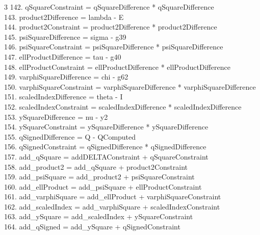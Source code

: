\documentclass[10pt]{article}
\begin{document}
\begin{multicols}{3}
142. qSquareConstraint = qSquareDifference * qSquareDifference\\
143. product2Difference = lambda - E\\
144. product2Constraint = product2Difference * product2Difference\\
145. psiSquareDifference = sigma - g39\\
146. psiSquareConstraint = psiSquareDifference * psiSquareDifference\\
147. ellProductDifference = tau - g40\\
148. ellProductConstraint = ellProductDifference * ellProductDifference\\
149. varphiSquareDifference = chi - g62\\
150. varphiSquareConstraint = varphiSquareDifference * varphiSquareDifference\\
151. scaledIndexDifference = theta - I\\
152. scaledIndexConstraint = scaledIndexDifference * scaledIndexDifference\\
153. ySquareDifference = nu - y2\\
154. ySquareConstraint = ySquareDifference * ySquareDifference\\
155. qSignedDifference = Q - QComputed\\
156. qSignedConstraint = qSignedDifference * qSignedDifference\\
157. add\_qSquare = addDELTAConstraint + qSquareConstraint\\
158. add\_product2 = add\_qSquare + product2Constraint\\
159. add\_psiSquare = add\_product2 + psiSquareConstraint\\
160. add\_ellProduct = add\_psiSquare + ellProductConstraint\\
161. add\_varphiSquare = add\_ellProduct + varphiSquareConstraint\\
162. add\_scaledIndex = add\_varphiSquare + scaledIndexConstraint\\
163. add\_ySquare = add\_scaledIndex + ySquareConstraint\\
164. add\_qSigned = add\_ySquare + qSignedConstraint\\
\end{multicols}
\end{document}
